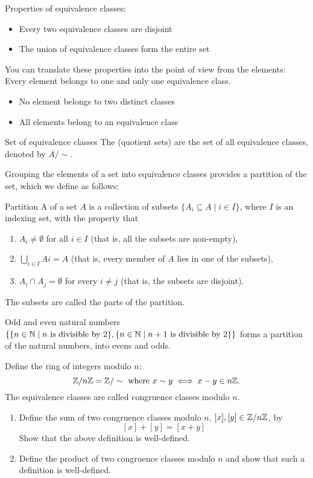 Properties of equivalence classes:
\begin{itemize}
\item Every two equivalence classes are disjoint
\item The union of equivalence classes form the entire set
\end{itemize}

You can translate these properties into the point of view from the elements: Every element belongs to one and only one equivalence class.
\begin{itemize}
\item No element belongs to two distinct classes
\item All elements belong to an equivalence class
\end{itemize}

\begin{defn}{Set of equivalence classes}{}
The  (quotient sets) are the set of all equivalence classes, denoted by $A/\sim$.
\end{defn}

Grouping the elements of a set into equivalence classes provides a partition of the set, which we define as follows:

\begin{defn}{Partition}{}
A  of a set $A$ is a collection of subsets $\{A_i \subseteq A \mid i \in I\}$, where $I$ is an indexing set, with the property that
\begin{enumerate}[label=(\roman*)]
\item $A_i \neq \emptyset$ for all $i \in I$ (that is, all the subsets are non-empty),
\item $\bigcup_{i\in I} Ai = A$ (that is, every member of $A$ lies in one of the subsets),
\item $A_i \cap A_j = \emptyset$ for every $i \neq j$ (that is, the subsets are disjoint).
\end{enumerate}
The subsets are called the parts of the partition.
\end{defn}

\begin{exmp}{Odd and even natural numbers}{}
$\{\{n \in \mathbb N \mid n \text{ is divisible by } 2\}, \{n \in \mathbb N \mid n+1 \text{ is divisible by } 2\}\}$ forms a partition of the natural numbers, into evens and odds.
\end{exmp}
\pagebreak

\begin{prbm}
Define the ring of integers modulo $n$:
\[ \mathbb Z/n\mathbb Z = \mathbb Z/\sim \text{ where } x \sim y \iff x-y \in n\mathbb Z. \]
The equivalence classes are called congruence classes modulo $n$.
\begin{enumerate}[label=(\alph*)]
\item Define the sum of two congruence classes modulo $n$, $[x], [y] \in \mathbb Z/n\mathbb Z$, by
\[ [x] + [y] = [x + y] \]
Show that the above definition is well-defined.
\item Define the product of two congruence classes modulo $n$ and show that such a definition is well-defined.
\end{enumerate} 
\end{prbm}

